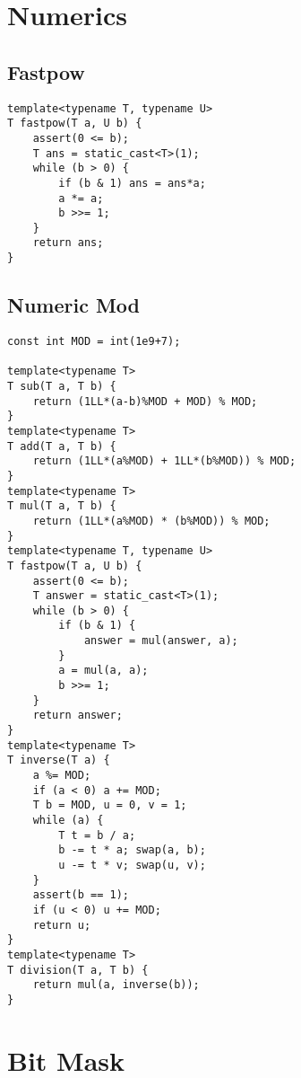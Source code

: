 \documentclass[10pt,letterpaper,twocolumn,twosided]{article}
\begin{document}
\section{Numerics}

\subsection{Fastpow}
\begin{lstlisting}
template<typename T, typename U>
T fastpow(T a, U b) {
    assert(0 <= b);
    T ans = static_cast<T>(1);
    while (b > 0) {
        if (b & 1) ans = ans*a;
        a *= a;
        b >>= 1;
    }
    return ans;
}
\end{lstlisting}

\subsection{Numeric Mod}
\begin{lstlisting}
const int MOD = int(1e9+7);

template<typename T>
T sub(T a, T b) {
    return (1LL*(a-b)%MOD + MOD) % MOD;
}
template<typename T>
T add(T a, T b) {
    return (1LL*(a%MOD) + 1LL*(b%MOD)) % MOD;
}
template<typename T>
T mul(T a, T b) {
    return (1LL*(a%MOD) * (b%MOD)) % MOD;
}
template<typename T, typename U>
T fastpow(T a, U b) {
    assert(0 <= b);
    T answer = static_cast<T>(1);
    while (b > 0) {
        if (b & 1) {
            answer = mul(answer, a);
        }
        a = mul(a, a);
        b >>= 1;
    }
    return answer;
}
template<typename T>
T inverse(T a) {
    a %= MOD;
    if (a < 0) a += MOD;
    T b = MOD, u = 0, v = 1;
    while (a) {
        T t = b / a;
        b -= t * a; swap(a, b);
        u -= t * v; swap(u, v);
    }
    assert(b == 1);
    if (u < 0) u += MOD;
    return u;
}
template<typename T>
T division(T a, T b) {
    return mul(a, inverse(b));
}
\end{lstlisting}


\section{Bit Mask}
\end{document}
